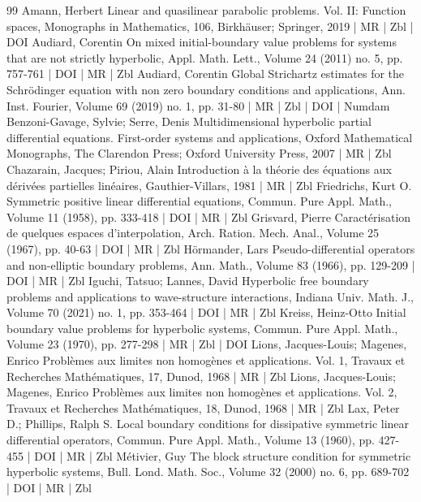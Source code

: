 \begin{thebibliography}{99}
Amann, Herbert Linear and quasilinear parabolic problems. Vol. II: Function spaces, Monographs in Mathematics, 106, Birkhäuser; Springer, 2019 | MR | Zbl | DOI
Audiard, Corentin On mixed initial-boundary value problems for systems that are not strictly hyperbolic, Appl. Math. Lett., Volume 24 (2011) no. 5, pp. 757-761 | DOI | MR | Zbl
Audiard, Corentin Global Strichartz estimates for the Schrödinger equation with non zero boundary conditions and applications, Ann. Inst. Fourier, Volume 69 (2019) no. 1, pp. 31-80 | MR | Zbl | DOI | Numdam
Benzoni-Gavage, Sylvie; Serre, Denis Multidimensional hyperbolic partial differential equations. First-order systems and applications, Oxford Mathematical Monographs, The Clarendon Press; Oxford University Press, 2007 | MR | Zbl
Chazarain, Jacques; Piriou, Alain Introduction à la théorie des équations aux dérivées partielles linéaires, Gauthier-Villars, 1981 | MR | Zbl
Friedrichs, Kurt O. Symmetric positive linear differential equations, Commun. Pure Appl. Math., Volume 11 (1958), pp. 333-418 | DOI | MR | Zbl
Grisvard, Pierre Caractérisation de quelques espaces d’interpolation, Arch. Ration. Mech. Anal., Volume 25 (1967), pp. 40-63 | DOI | MR | Zbl
Hörmander, Lars Pseudo-differential operators and non-elliptic boundary problems, Ann. Math., Volume 83 (1966), pp. 129-209 | DOI | MR | Zbl
Iguchi, Tatsuo; Lannes, David Hyperbolic free boundary problems and applications to wave-structure interactions, Indiana Univ. Math. J., Volume 70 (2021) no. 1, pp. 353-464 | DOI | MR | Zbl
Kreiss, Heinz-Otto Initial boundary value problems for hyperbolic systems, Commun. Pure Appl. Math., Volume 23 (1970), pp. 277-298 | MR | Zbl | DOI
Lions, Jacques-Louis; Magenes, Enrico Problèmes aux limites non homogènes et applications. Vol. 1, Travaux et Recherches Mathématiques, 17, Dunod, 1968 | MR | Zbl
Lions, Jacques-Louis; Magenes, Enrico Problèmes aux limites non homogènes et applications. Vol. 2, Travaux et Recherches Mathématiques, 18, Dunod, 1968 | MR | Zbl
Lax, Peter D.; Phillips, Ralph S. Local boundary conditions for dissipative symmetric linear differential operators, Commun. Pure Appl. Math., Volume 13 (1960), pp. 427-455 | DOI | MR | Zbl
Métivier, Guy The block structure condition for symmetric hyperbolic systems, Bull. Lond. Math. Soc., Volume 32 (2000) no. 6, pp. 689-702 | DOI | MR | Zbl

\end{thebibliography}
